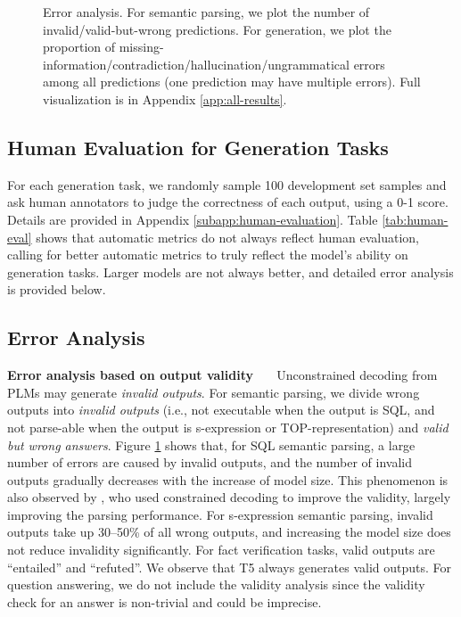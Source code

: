 \documentclass[11pt]{article}
\begin{document}
\begin{figure}[t]
\centering
\caption{\label{fig:error-analysis} Error analysis. For semantic parsing, we plot the number of invalid/valid-but-wrong predictions. For generation, we plot the proportion of missing-information/contradiction/hallucination/ungrammatical errors among all predictions (one prediction may have multiple errors). Full visualization is in Appendix \ref{app:all-results}. } 
\end{figure}
 
\subsection{Human Evaluation for Generation Tasks}
\label{subsec:human-eval}
For each generation task, we randomly sample 100 development set samples and ask human annotators to judge the correctness of each output, using a 0-1 score. Details are provided in Appendix \ref{subapp:human-evaluation}. 
Table \ref{tab:human-eval} shows that automatic metrics do not always reflect human evaluation, calling for better automatic metrics to truly reflect the model's ability on generation tasks. 
Larger models are not always better, and detailed error analysis is provided below. 

\subsection{Error Analysis}
\label{subsec:error}

\noindent\textbf{Error analysis based on output validity \ \ }  
Unconstrained decoding from PLMs may generate \textit{invalid outputs}. 
For semantic parsing, we divide wrong outputs into \textit{invalid outputs} (i.e., not executable when the output is SQL, and not parse-able when the output is s-expression or TOP-representation) and \textit{valid but wrong answers}. 
Figure \ref{fig:error-analysis} shows that, for SQL semantic parsing, a large number of errors are caused by invalid outputs, and the number of invalid outputs gradually decreases with the increase of model size. This phenomenon is also observed by \citet{Scholak2021:PICARD}, who used constrained decoding to improve the validity, largely improving the parsing performance.
For s-expression semantic parsing, invalid outputs take up 30--50\% of all wrong outputs, and increasing the model size does not reduce invalidity significantly. 
For fact verification tasks, valid outputs are ``entailed'' and ``refuted''. 
We observe that T5 always generates valid outputs. 
For question answering, we do not include the validity analysis since the validity check for an answer is non-trivial and could be imprecise. 
\end{document}

